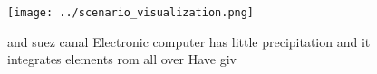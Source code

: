 \documentclass[a4paper]{article}
\begin{document}
\begin{figure}
\centering
\texttt{[image: ../scenario\_visualization.png]}
\caption{ and suez canal Electronic computer has little precipitation and it integrates elements rom all over Have giv
}
\end{figure}
 
\end{document}
